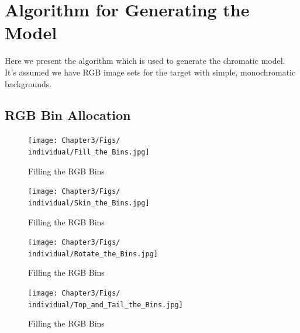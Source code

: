 \section{Algorithm for Generating the Model}\label{sec:AlgorithmForGeneratingModel}
Here we present the algorithm which is used to generate the chromatic model. It's assumed we have RGB image sets for the target with simple, monochromatic backgrounds.




\subsection{RGB Bin Allocation}\label{sec:RGBBinAllocation}



\def\individual{FJN}


\begin{figure}[h!]
  \centering
    \texttt{[image: Chapter3/Figs/\\individual/Fill\_the\_Bins.jpg]}
        \caption{Filling the RGB Bins}  \label{fig:FillTheBins}
    \end{figure}


\begin{figure}[h!]
  \centering
    \texttt{[image: Chapter3/Figs/\\individual/Skin\_the\_Bins.jpg]}
        \caption{Filling the RGB Bins}  \label{fig:Skin_the_Bins}
    \end{figure}

\begin{figure}[h!]
  \centering
    \texttt{[image: Chapter3/Figs/\\individual/Rotate\_the\_Bins.jpg]}
        \caption{Filling the RGB Bins}  \label{fig:Rotate_the_Bins}
    \end{figure}

\begin{figure}[h!]
  \centering
    \texttt{[image: Chapter3/Figs/\\individual/Top\_and\_Tail\_the\_Bins.jpg]}
        \caption{Filling the RGB Bins}  \label{fig:Top_and_Tail_the_Bins}
    \end{figure}

